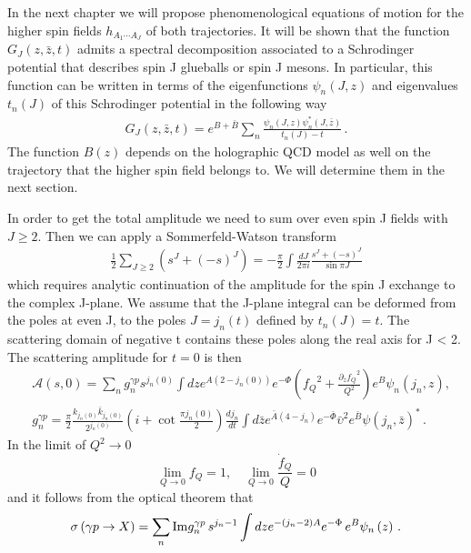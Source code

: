 \documentclass[a4paper,12pt]{article}
\begin{document}
In the next chapter we will propose phenomenological equations of motion for the higher spin fields $h_{A_1 \cdots A_J}$ of both trajectories. It will be shown that the function $G_J \left(z, \bar{z}, t\right)$ admits a spectral decomposition associated to a Schrodinger potential that describes spin J glueballs or spin J mesons. In particular, this function can be written in terms of the eigenfunctions $\psi_n\left(J, z\right)$ and eigenvalues $t_n\left(J\right)$ of this Schrodinger potential in the following way
\begin{align} 
G_J \left(z , \bar{z}, t \right) = e^{B + \bar{B}}  \sum_n \frac{\psi_n \left(J, z\right) \psi_n^* \left(J, \bar{z}\right)}{t_n\left(J\right) - t} \, .
\end{align}
The function $B(z)$ depends on the holographic QCD model as well on the trajectory that the higher spin field belongs to. We will determine them in the next section.

In order to get the total amplitude we need to sum over even spin J fields with $J \geq 2$. Then we can apply a Sommerfeld-Watson transform
\begin{align}
\frac{1}{2} \sum_{J \geq 2} \left(s^J + {\left(-s\right)}^J\right) = - \frac{\pi}{2} \int \frac{d J}{2 \pi i} \frac{s^J + \left(-s\right)^J}{\sin \pi J}
\end{align}
which requires analytic continuation of the amplitude for the spin J exchange to the complex J-plane. We assume that the J-plane integral can be deformed from the poles at even J, to the poles $J = j_n \left(t\right)$ defined by $t_n \left(J\right) = t$. The scattering domain of negative t contains these poles along the real axis for J < 2. The scattering amplitude for $t = 0$ is then
\begin{align}
&\mathcal{A} \left(s, 0 \right) = \sum_n g^{\gamma p}_n s^{j_n\left(0\right)} \int dz e^{A(2 - {j_n\left(0\right)})} e^{-\Phi}  \left(  {f_Q}^2 + \frac{{\partial_z f_Q}^2}{Q^2}  \right) e^{B} \psi_n \left(j_n, z\right), \label{eq:gp_forward_scattering_amp} \\
& g_n^{\gamma p} = \frac{\pi}{2} \frac{k_{j_n\left(0\right)} \bar{k}_{j_n\left(0\right)}}{2^{j_n\left(0\right)}}  \left(i + \cot \frac{\pi j_n\left(0\right)}{2} \right) \frac{d j_n}{dt} \int d\bar{z} e^{\bar{A}\left( 4 - j_n \right)} e^{-\bar{\Phi}}  {\bar{\upsilon}}^2 e^{\bar{B}}  {\psi\left(j_n, \bar{z}\right)}^{*} \, . \label{eq:gp_couplings_def}
\end{align}
In the limit of $Q^2 \rightarrow 0$
\begin{equation}
\lim_{Q\rightarrow 0} f_Q = 1 , \quad \lim_{Q\rightarrow 0} \frac{\dot{f}_Q}{Q} = 0
\end{equation}
and it follows from the optical theorem that
\begin{equation}
\sigma\left(\gamma p \rightarrow X\right) = \sum_n {\rm Im} g^{\gamma p}_n \,  s^{j_n - 1} \int dz e^{-\left(j_n - 2 \right)A } e^{-\Phi}  \, e^B \psi_n\left(z\right) \, .
\label{eq:sigma_gp_hol_gens}
\end{equation}
\end{document}
